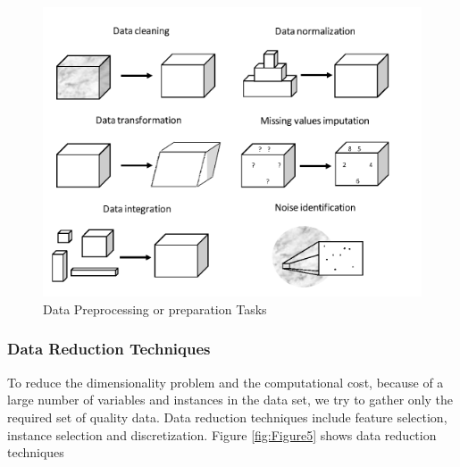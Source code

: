 \documentclass[sigconf]{acmart}
\begin{document}
\begin{figure}[htb]
  \centering
  \includegraphics[width=1.0\columnwidth]{project/images/Figure4.png}
  \caption{Data Preprocessing or preparation Tasks
  \cite{preprocessing}}
  \label{fig:Figure4} 
\end{figure}

\subsubsection{Data Reduction Techniques}

To reduce the dimensionality problem and the computational cost, because of a large number of variables and instances in the data set, we try to gather only the required set of quality data. Data reduction techniques include feature selection, instance selection and discretization. Figure \ref{fig:Figure5} shows data reduction techniques \cite{preprocessing}
\end{document}
